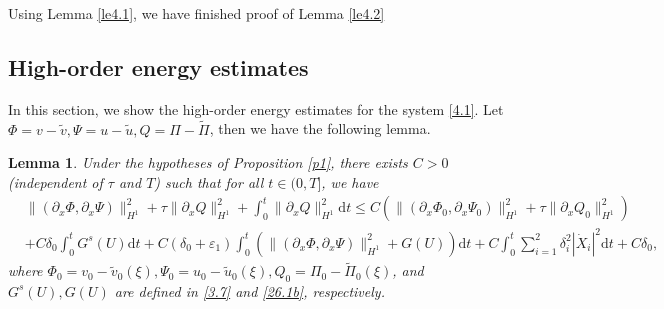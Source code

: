 \documentclass[10pt,reqno]{amsart}
\numberwithin{equation}{section}
\newtheorem{lemma}[theorem]{Lemma}
\newcommand{\dif}{\mathrm{d}}
\begin{document}
Using Lemma \ref{le4.1}, we have finished proof of Lemma \ref{le4.2}
\subsection{High-order energy estimates}In this section, we show the high-order energy estimates for the system \eqref{4.1}. Let $\Phi=v-\widetilde{v},\Psi=u-\widetilde{u},Q=\Pi-\widetilde{\Pi}$, then we have the following lemma.
\begin{lemma}\label{Le4.7}
Under the hypotheses of Proposition \ref{p1}, there exists $C>0$ (independent of $\tau$ and $T$) such that for all $t\in(0,T]$, we have
\begin{equation}\label{26.2}
\begin{aligned}
&\|\left(\partial_{x}\Phi, \partial_{x}\Psi\right)\|_{H^1}^2
+\tau\|\partial_{x}Q\|_{H^1}^2
+\int_0^t\|\partial_{x}Q\|_{H^1}^2\dif t\leq
C(\|\left(\partial_{x}\Phi_0, \partial_{x}\Psi_0\right)\|_{H^1}^2
+\tau\|\partial_{x}Q_0\|_{H^1}^2)\\
 &+C\delta_0\int_0^tG^s(U)\dif t
+C(\delta_0+\varepsilon_1)\int_0^t\left(\|\left(\partial_{x}\Phi, \partial_{x}\Psi\right)\|_{H^1}^2+G(U)\right)\dif t
+C\int_0^t\sum\limits_{i=1}^2\delta_i^2|\dot{X}_i|^2\dif t
+C\delta_0,
\end{aligned}
\end{equation}
where $\Phi_0=v_0-\widetilde{v}_0(\xi), \Psi_0=u_0-\widetilde{u}_0(\xi), Q_0=\Pi_0-\widetilde{\Pi}_0(\xi)$, and $G^s(U), G(U)$ are defined in \eqref{3.7} and \eqref{26.1b}, respectively.
\end{lemma}
\end{document}
